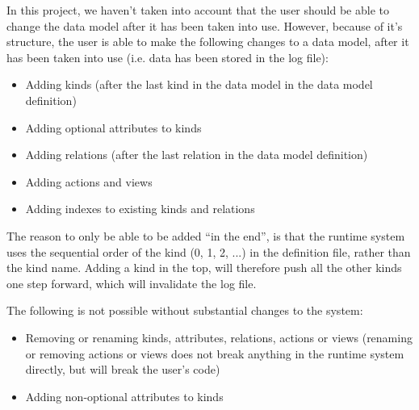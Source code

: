 In this project, we haven't taken into account that the user should
be able to change the data model after it has been taken into use.
However, because of it's structure, the user is able to make the following
changes to a data model, after it has been taken into use (i.e. data
has been stored in the log file):
\begin{itemize}
\item Adding kinds (after the last kind in the data model in the data model
definition)
\item Adding optional attributes to kinds
\item Adding relations (after the last relation in the data model definition)
\item Adding actions and views
\item Adding indexes to existing kinds and relations
\end{itemize}
The reason to only be able to be added ``in the end'', is that the
runtime system uses the sequential order of the kind (0, 1, 2, ...)
in the definition file, rather than the kind name. Adding a kind in
the top, will therefore push all the other kinds one step forward,
which will invalidate the log file. 

The following is not possible without substantial changes to the system:
\begin{itemize}
\item Removing or renaming kinds, attributes, relations, actions or views
(renaming or removing actions or views does not break anything in
the runtime system directly, but will break the user's code)
\item Adding non-optional attributes to kinds\end{itemize}

